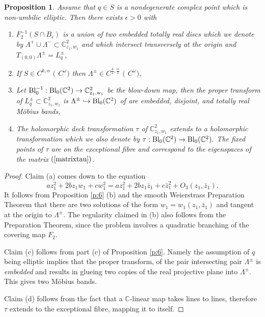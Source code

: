 \documentclass{amsart}
\newtheorem{proposition}[theorem]{Proposition}
\begin{document}
\begin{proposition} \label{p:blowup}
Assume that $ q\in S$ is a nondegenerate complex point which is non-umbilic elliptic. Then there exists  $\epsilon > 0$ with
\begin{enumerate}
\item[(a)]  $F_2^{-1}( S \cap B_\epsilon) $ is a union of two embedded totally real discs which we denote by $\Lambda^+ \cup \Lambda^- \subset {\mathbb{C}}^2_{z_1,w_1}$ and which intersect transversely at the origin and $T_{(0,0)}\Lambda^\pm=L^\pm_{ q}$,
\item[(b)] If $S\in C^{k,\alpha}$ $($ $C^\omega$$)$ then $\Lambda^\pm\in C^{\frac{k}{2},\frac{\alpha}{2}}$ $($ $C^\omega$$)$,
\item[(c)] Let $\rm{Bl}_0^{-1} :\rm{Bl}_0({\mathbb{C}}^2)\to {\mathbb{C}}^2_{z_1,w_1}$ be the blow-down map, then the proper transform of $L^\pm_q \subset{\mathbb{C}}^2_{z_1,w_1}$ is  $\Lambda^\pm \hookrightarrow \rm{Bl}_0({\mathbb{C}}^2)$ of  are embedded, disjoint, and totally real M\"obius bands,
\item[(d)] The holomorphic deck transformation $\tau$ of ${\mathbb{C}}^2_{z_1,w_1}$ extends to a holomorphic transformation which we also denote by $\tau : \rm{Bl}_0({\mathbb{C}}^2) \to \rm{Bl}_0({\mathbb{C}}^2).$ The fixed points of $\tau$ are on the exceptional fibre and correspond to the eigenspaces of the matrix  $(\ref{matrixtau})$. 
\end{enumerate}
\end{proposition}

\begin{proof}
    Claim (a) comes down to the equation
\[
az_1^2 + 2bz_1w_1 + c w_1^2=az_1^2 + 2bz_1\bar{z}_1 + c \bar{z}_1^2 + O_3(z_1,\bar{z}_1).
\]
It follows from Proposition \ref{p:6} (b) and the smooth Weierstrass Preparation Theorem \cite{GG} that there are two solutions of the form  $w_1=w_1(z_1,\bar{z}_1)$ and tangent at the origin to $\Lambda^\pm$. 
The regularity claimed in (b) also follows from the Preparation Theorem, since the problem involves a quadratic branching of the covering map $F_2$. 

Claim (c) follows from part (c) of Proposition \ref{p:6}. Namely the assumption of $q$ being elliptic implies that the proper transform, of the pair intersecting pair $\Lambda^\pm$ is {\it embedded} and results in glueing two copies of the real projective plane into $\Lambda^\pm$. This gives two M\"obius bands. 

Claim (d) follows from the fact that a ${\mathbb C}$-linear map takes lines to lines, therefore $\tau$ extends to the exceptional fibre, mapping it to itself.
\end{proof}   
\end{document}
